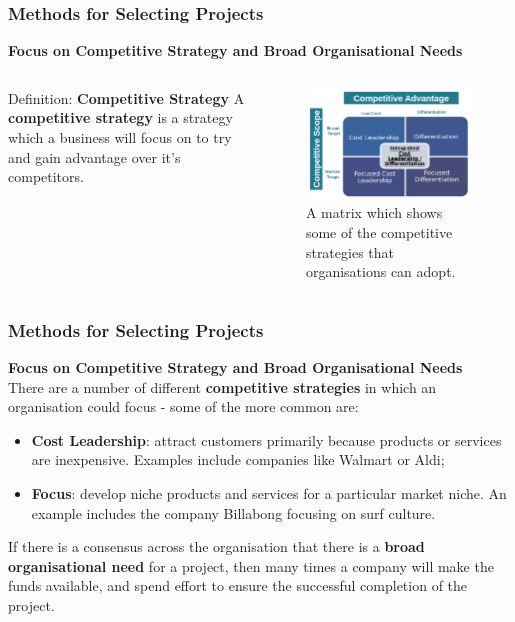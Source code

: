 \documentclass[aspectratio=169]{beamer}
\begin{document}
\begin{frame}
\frametitle{Methods for Selecting Projects}
\textbf{Focus on Competitive Strategy and Broad Organisational Needs}
\begin{columns}[t]
\begin{block}{Definition: \textbf{Competitive Strategy}}
A \textbf{competitive strategy} is a strategy which a business will focus on to try and gain advantage over it's competitors.
\end{block}
\begin{figure}
\includegraphics[scale=0.25]{comp_adv}
\caption{A matrix which shows some of the competitive strategies that organisations can adopt.}
\end{figure}
\end{columns}
\end{frame}
\begin{frame}
\frametitle{Methods for Selecting Projects}
\textbf{Focus on Competitive Strategy and Broad Organisational Needs}\\
\vspace{0.5cm}
There are a number of different \textbf{competitive strategies} in which an organisation could focus - some of the more common are:
\begin{itemize}
\item \textbf{Cost Leadership}: attract customers primarily because products or services are inexpensive. Examples include companies like Walmart or Aldi;
\item \textbf{Focus}: develop niche products and services for a particular market niche. An example includes the company Billabong focusing on surf culture.
\end{itemize}
\vspace{0.5cm}
If there is a consensus across the organisation that there is a \textbf{broad organisational need} for a project, then many times a company will make the funds available, and spend effort to ensure the successful completion of the project.
\end{frame}
\end{document}
